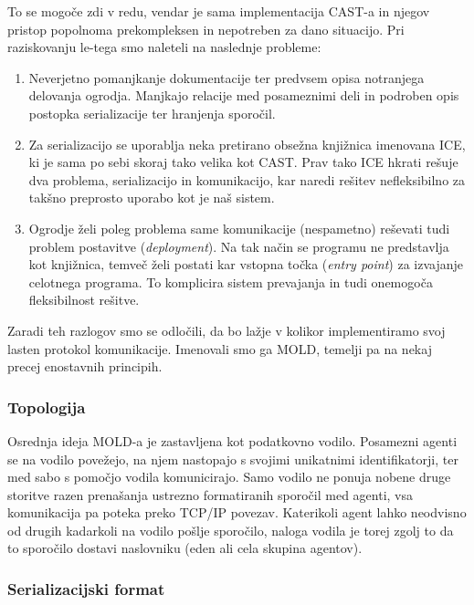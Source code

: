 \documentclass[a4paper,10pt]{article}
\begin{document}
To se mogoče zdi v redu, vendar je sama implementacija CAST-a in njegov pristop popolnoma prekompleksen in nepotreben za dano situacijo. Pri raziskovanju le-tega smo naleteli na naslednje probleme:
\begin{enumerate}
  \item Neverjetno pomanjkanje dokumentacije ter predvsem opisa notranjega delovanja ogrodja. Manjkajo relacije med posameznimi deli in podroben opis postopka serializacije ter hranjenja sporočil.
  
  \item Za serializacijo se uporablja neka pretirano obsežna knjižnica imenovana ICE, ki je sama po sebi skoraj tako velika kot CAST. Prav tako ICE hkrati rešuje dva problema, serializacijo in komunikacijo, kar naredi rešitev nefleksibilno za takšno preprosto uporabo kot je naš sistem.
  
  \item Ogrodje želi poleg problema same komunikacije (nespametno) reševati tudi problem postavitve (\textit{deployment}). Na tak način se programu ne predstavlja kot knjižnica, temveč želi postati kar vstopna točka (\textit{entry point}) za izvajanje celotnega programa. To komplicira sistem prevajanja in tudi onemogoča fleksibilnost rešitve.
\end{enumerate}

Zaradi teh razlogov smo se odločili, da bo lažje v kolikor implementiramo svoj lasten protokol komunikacije. Imenovali smo ga MOLD, temelji pa na nekaj precej enostavnih principih.

\subsubsection{Topologija}

Osrednja ideja MOLD-a je zastavljena kot podatkovno vodilo. Posamezni agenti se na vodilo povežejo, na njem nastopajo s svojimi unikatnimi identifikatorji, ter med sabo s pomočjo vodila komunicirajo. Samo vodilo ne ponuja nobene druge storitve razen prenašanja ustrezno formatiranih sporočil med agenti, vsa komunikacija pa poteka preko TCP/IP povezav. Katerikoli agent lahko neodvisno od drugih kadarkoli na vodilo pošlje sporočilo, naloga vodila je torej zgolj to da to sporočilo dostavi naslovniku (eden ali cela skupina agentov).

\subsubsection{Serializacijski format}
\end{document}
